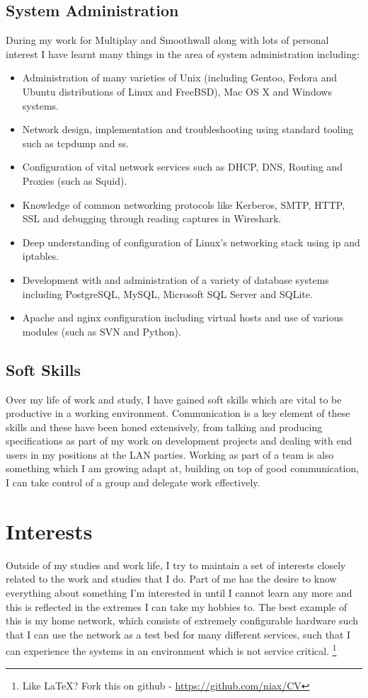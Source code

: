 \documentclass[11pt]{report}
\newcommand\blfootnote[1]{%
	\begingroup
	\renewcommand\thefootnote{}\footnote{#1}%
	\addtocounter{footnote}{-1}%
	\endgroup
}
\begin{document}
\subsection*{System Administration}
During my work for Multiplay and Smoothwall along with lots of personal interest I have learnt many things in the area of system administration including:
\begin{itemize}[itemsep=2pt ,parsep=2pt]
\item Administration of many varieties of Unix (including Gentoo, Fedora and Ubuntu distributions of Linux and FreeBSD), Mac OS X and Windows systems.
\item Network design, implementation and troubleshooting using standard tooling such as {\ttfamily tcpdump} and {\ttfamily ss}.
\item Configuration of vital network services such as DHCP, DNS, Routing and Proxies (such as Squid).
\item Knowledge of common networking protocols like Kerberos, SMTP, HTTP, SSL and debugging through reading captures in Wireshark.
\item Deep understanding of configuration of Linux's networking stack using {\ttfamily ip} and {\ttfamily iptables}.
\item Development with and administration of a variety of database systems including PostgreSQL, MySQL, Microsoft SQL Server and SQLite.
\item Apache and nginx configuration including virtual hosts and use of various modules (such as SVN and Python).
\end{itemize}
\subsection*{Soft Skills}
Over my life of work and study, I have gained soft skills which are vital to be productive in a working environment.
Communication is a key element of these skills and these have been honed extensively, from talking and producing specifications as part of my work on development projects and dealing with end users in my positions at the LAN parties.
Working as part of a team is also something which I am growing adapt at, building on top of good communication, I can take control of a group and delegate work effectively.
\section*{Interests}
Outside of my studies and work life, I try to maintain a set of interests closely related to the work and studies that I do.
Part of me has the desire to know everything about something I'm interested in until I cannot learn any more and this is reflected in the extremes I can take my hobbies to.
The best example of this is my home network, which consists of extremely configurable hardware such that I can use the network as a test bed for many different services, such that I can experience the systems in an environment which is not service critical.
\blfootnote{Like \LaTeX? Fork this on github - \url{https://github.com/niax/CV}}
\end{document}
